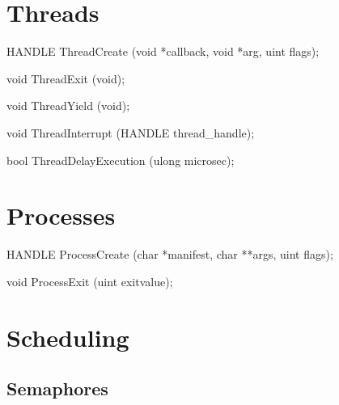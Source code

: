 \section{Threads}
\label{sec:abi:thread}


\begin{paldef}
HANDLE ThreadCreate (void *callback, void *arg,
                     uint flags);
\end{paldef}



\begin{paldef}
void ThreadExit (void);
\end{paldef}



\begin{paldef}
void ThreadYield (void);
\end{paldef}



\begin{paldef}
void ThreadInterrupt (HANDLE thread_handle);
\end{paldef}



\begin{paldef}
bool ThreadDelayExecution (ulong microsec);
\end{paldef}



\section{Processes}
\label{sec:abi:proc}



\begin{paldef}
HANDLE ProcessCreate (char *manifest, char **args,
                      uint flags);
\end{paldef}



\begin{paldef}
void ProcessExit (uint exitvalue);
\end{paldef}




\section{Scheduling}


\subsection*{Semaphores}

